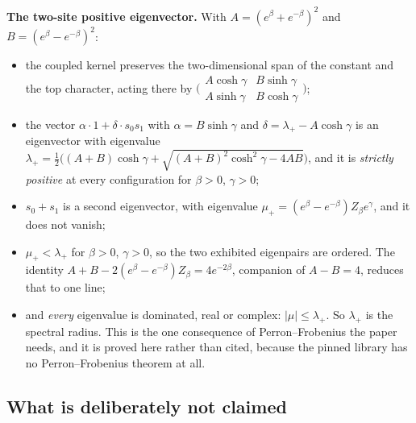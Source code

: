 \documentclass[11pt]{article}
\theoremstyle{definition}
\begin{document}
\medskip
\noindent\textbf{The two-site positive eigenvector.}  With
$A=(e^\beta+e^{-\beta})^2$ and $B=(e^\beta-e^{-\beta})^2$:
\begin{itemize}
\item the coupled kernel preserves the two-dimensional span of the constant and
      the top character, acting there by
      $\bigl(\begin{smallmatrix} A\cosh\gamma & B\sinh\gamma\\
      A\sinh\gamma & B\cosh\gamma\end{smallmatrix}\bigr)$;
\item the vector $\alpha\cdot 1+\delta\cdot s_0s_1$ with
      $\alpha = B\sinh\gamma$ and
      $\delta=\lambda_+-A\cosh\gamma$ is an eigenvector with eigenvalue
      $\lambda_+ = \tfrac12\bigl((A+B)\cosh\gamma+\sqrt{(A+B)^2\cosh^2\gamma-4AB}\bigr)$,
      and it is \emph{strictly positive} at every configuration for
      $\beta>0$, $\gamma>0$;
\item $s_0+s_1$ is a second eigenvector, with eigenvalue
      $\mu_+ = (e^\beta-e^{-\beta})Z_\beta e^{\gamma}$, and it does not vanish;
\item $\mu_+<\lambda_+$ for $\beta>0$, $\gamma>0$, so the two exhibited
      eigenpairs are ordered.  The identity $A+B-2(e^\beta-e^{-\beta})Z_\beta
      =4e^{-2\beta}$, companion of $A-B=4$, reduces that to one line;
\item and \emph{every} eigenvalue is dominated, real or complex:
      $|\mu|\le\lambda_+$.  So $\lambda_+$ is the spectral radius.  This is the
      one consequence of Perron--Frobenius the paper needs, and it is proved
      here rather than cited, because the pinned library has no
      Perron--Frobenius theorem at all.
\end{itemize}

\subsection{What is deliberately not claimed}
\end{document}
